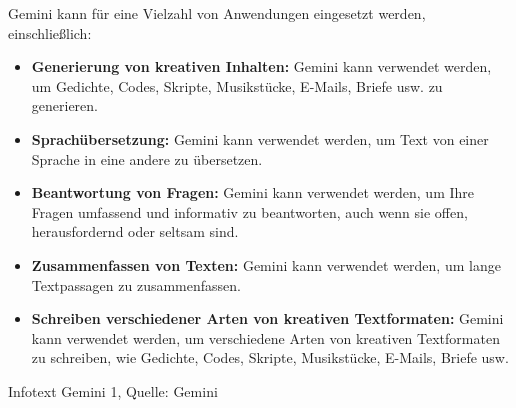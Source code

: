 \begin{prompt}
\begin{tcolorbox}[colback=gray!20, colframe=gray!20, boxrule=0pt, sharp corners]
        Gemini kann für eine Vielzahl von Anwendungen eingesetzt werden, einschließlich:
        \begin{itemize}
            \item \textbf{Generierung von kreativen Inhalten:} Gemini kann verwendet werden, um Gedichte, Codes, Skripte, Musikstücke, 
            E-Mails, Briefe usw. zu generieren.
            \item \textbf{Sprachübersetzung:} Gemini kann verwendet werden, um Text von einer Sprache in eine andere zu übersetzen.
            \item \textbf{Beantwortung von Fragen:} Gemini kann verwendet werden, um Ihre Fragen umfassend und informativ zu beantworten, 
            auch wenn sie offen, herausfordernd oder seltsam sind.
            \item \textbf{Zusammenfassen von Texten:} Gemini kann verwendet werden, um lange Textpassagen zu zusammenfassen.
            \item \textbf{Schreiben verschiedener Arten von kreativen Textformaten:} Gemini kann verwendet werden, um verschiedene Arten von 
            kreativen Textformaten zu schreiben, wie Gedichte, Codes, Skripte, Musikstücke, E-Mails, Briefe usw.
        \end{itemize}
    \vfill
    \end{tcolorbox}
    \caption{Infotext Gemini 1, Quelle: Gemini}
    \label{InfotextGemini1}
\end{prompt}

